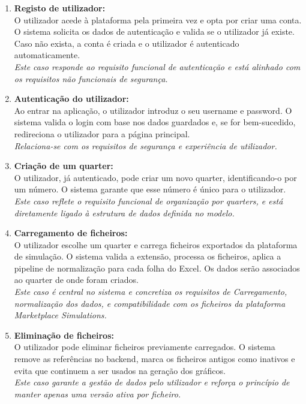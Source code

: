 \begin{enumerate}
    \item \textbf{Registo de utilizador: } \\
    O utilizador acede à plataforma pela primeira vez e opta por criar uma conta. O sistema solicita os dados de autenticação e valida se o utilizador já existe. Caso não exista, a conta é criada e o utilizador é autenticado automaticamente. \\
    \textit{Este caso responde ao requisito funcional de autenticação e está alinhado com os requisitos não funcionais de segurança.}
    
    \item \textbf{Autenticação do utilizador: } \\
    Ao entrar na aplicação, o utilizador introduz o seu username e password. O sistema valida o login com base nos dados guardados e, se for bem-sucedido, redireciona o utilizador para a página principal. \\
    \textit{Relaciona-se com os requisitos de segurança e experiência de utilizador.}
    
    \item \textbf{Criação de um quarter: } \\
    O utilizador, já autenticado, pode criar um novo quarter, identificando-o por um número. O sistema garante que esse número é único para o utilizador. \\
    \textit{Este caso reflete o requisito funcional de organização por quarters, e está diretamente ligado à estrutura de dados definida no modelo.}
    
    \item \textbf{Carregamento de ficheiros: } \\
    O utilizador escolhe um quarter e carrega ficheiros exportados da plataforma de simulação. O sistema valida a extensão, processa os ficheiros, aplica a pipeline de normalização para cada folha do Excel. Os dados serão associados ao quarter de onde foram criados. \\
    \textit{Este caso é central no sistema e concretiza os requisitos de Carregamento, normalização dos dados, e compatibilidade com os ficheiros da plataforma Marketplace Simulations.}

    \item \textbf{Eliminação de ficheiros: } \\
    O utilizador pode eliminar ficheiros previamente carregados. O sistema remove as referências no backend, marca os ficheiros antigos como inativos e evita que continuem a ser usados na geração dos gráficos. \\
    \textit{Este caso garante a gestão de dados pelo utilizador e reforça o princípio de manter apenas uma versão ativa por ficheiro.}
    

\end{enumerate}
